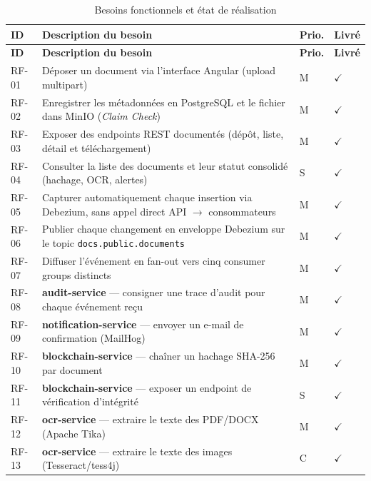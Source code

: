 \documentclass[12pt,a4paper,openany]{report}
\begin{document}
    \begin{longtable}{P{1.1cm}P{7.6cm}P{1.1cm}P{1.3cm}}
      \caption{Besoins fonctionnels et \'etat de r\'ealisation}\\
      \toprule
      \textbf{ID} & \textbf{Description du besoin} & \textbf{Prio.} & \textbf{Livr\'e} \\
      \midrule
      \endfirsthead
      \toprule
      \textbf{ID} & \textbf{Description du besoin} & \textbf{Prio.} & \textbf{Livr\'e} \\
      \midrule
      \endhead
      \bottomrule
      \endfoot
      RF-01 & D\'eposer un document via l'interface Angular (upload multipart) & M & $\checkmark$ \\[3pt]
      RF-02 & Enregistrer les m\'etadonn\'ees en PostgreSQL et le fichier dans MinIO (\emph{Claim Check}) & M & $\checkmark$ \\[3pt]
      RF-03 & Exposer des endpoints REST document\'es (d\'ep\^ot, liste, d\'etail et t\'el\'echargement) & M & $\checkmark$ \\[3pt]
      RF-04 & Consulter la liste des documents et leur statut consolid\'e (hachage, OCR, alertes) & S & $\checkmark$ \\[3pt]
      RF-05 & Capturer automatiquement chaque insertion via Debezium, sans appel direct API $\to$ consommateurs & M & $\checkmark$ \\[3pt]
      RF-06 & Publier chaque changement en enveloppe Debezium sur le topic \texttt{docs.public.documents} & M & $\checkmark$ \\[3pt]
      RF-07 & Diffuser l'\'ev\'enement en fan-out vers cinq consumer groups distincts & M & $\checkmark$ \\[3pt]
      RF-08 & \textbf{audit-service} --- consigner une trace d'audit pour chaque \'ev\'enement re\c{c}u & M & $\checkmark$ \\[3pt]
      RF-09 & \textbf{notification-service} --- envoyer un e-mail de confirmation (MailHog) & M & $\checkmark$ \\[3pt]
      RF-10 & \textbf{blockchain-service} --- cha\^iner un hachage SHA-256 par document & M & $\checkmark$ \\[3pt]
      RF-11 & \textbf{blockchain-service} --- exposer un endpoint de v\'erification d'int\'egrit\'e & S & $\checkmark$ \\[3pt]
      RF-12 & \textbf{ocr-service} --- extraire le texte des PDF/DOCX (Apache Tika) & M & $\checkmark$ \\[3pt]
      RF-13 & \textbf{ocr-service} --- extraire le texte des images (Tesseract/tess4j) & C & $\checkmark$ \\[3pt]

\end{longtable}
\end{document}
